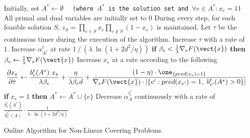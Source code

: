 \begin{algorithm}[!ht]
	\begin{algorithmic}[1]
	\STATE Initially, set $A^* \gets \emptyset$ \ \ \texttt{(where $A^*$ is the solution set and $\forall e \in A^* : x_{e} = 1$)}
	\STATE All primal and dual variables are initially set to 0
	\STATE During every step, for each feasible solution $S$, $z_{S} = \prod_{e \in S} x_{e} \prod_{e \notin S} (1 - x_{e})$ is maintained.
	\STATE Let $\tau$ be the continuous timer during the execution of the algorithm.
			\STATE Increase $\tau$ with a rate of $1$.
			\STATE Increase $\alpha^{t}_{A^{*}}$ at rate $1\ /\ (\lambda \ \ln(1+2d^{2}/\eta))$
			\label{algo-covering:alpha}
				\STATE \textbf{if} $\beta_{e} <  \frac{1}{\lambda} \nabla_{e} F(\vect{x})$ \textbf{then}
				$\beta_{e} \gets \frac{1}{\lambda} \nabla_{e} F(\vect{x})$
				\label{algo-covering:beta}
				\STATE Increase $x_{e}$ at a rate according to the following
				\begin{align*}
					\frac{\partial x_{e}}{\partial \tau}	\gets
					\frac{b^{t}_{e}(A^{*}) \ x_{e}}{\lambda \beta_{e}} + \frac{\eta}{\lambda \beta_{e} d}
					+ \frac{(1 - \eta) \cdot \one_{\{pred(x_{e}) = 1\}}}{\nabla_{e} F(\vect{x}) \cdot |\{e': pred(x_{e'}) = 1,\ b^{t}_{e'}(A^{*}) > 0\}| }
				\end{align*}
				\label{algo-covering:x}
			\ENDFOR
			\STATE \textbf{if} $x_{e} = 1$ \textbf{then} $A^{*} \gets A^{*} \cup \{e\}$
			 \label{algo-decrease}
						 \label{algo-covering:bmax}
							\STATE Decrease $\alpha^{t_{e}^{*}}_{A}$ continuously with a rate of
							$\frac{b^{t}_{e}(A^{*})}{b^{t_{e}^{*}}_{e}(A)} \cdot\frac{1}{\lambda \cdot \ln(1+2d^{2}/\eta)}$
							\label{algo-covering:decrease}
					\ENDFOR
				\ENDWHILE
			\ENDFOR
		\ENDWHILE
	\ENDFOR
	\end{algorithmic}
	\caption{Online Algorithm for Non-Linear Covering Problems.}
	\label{algo:covering}
\end{algorithm}



